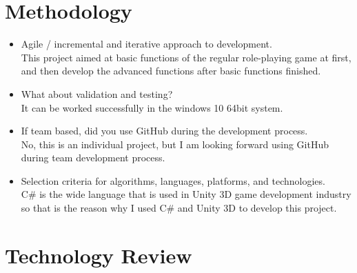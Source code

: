 \chapter{Methodology}

\begin{itemize}
\item Agile / incremental and iterative approach to development. \\
This project aimed at basic functions of the regular role-playing game at first, and then develop the advanced functions after basic functions finished. 
\item What about validation and testing? \\
It can be worked successfully in the windows 10 64bit system. 
\item If team based, did you use GitHub during the development process.\\
No, this is an individual project, but I am looking forward using GitHub during team development process.
\item Selection criteria for algorithms, languages, platforms, and technologies.\\
C\# is the wide language that is used in Unity 3D game development industry so that is the reason why I used C\# and Unity 3D to develop this project.
\end{itemize}


\chapter{Technology Review}
